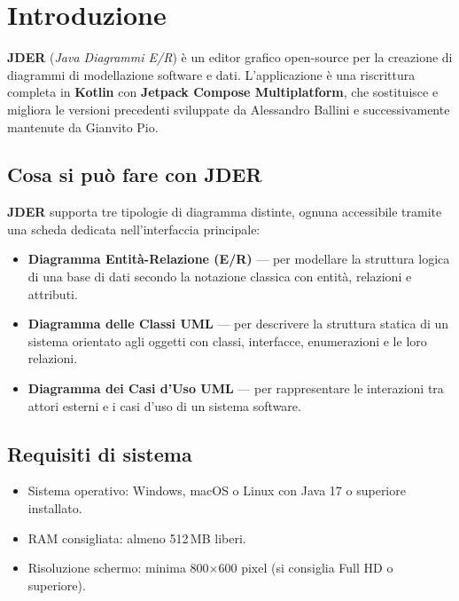 \documentclass[a4paper,11pt]{article}
\newcommand{\jder}{\textbf{JDER}}
\begin{document}
\tableofcontents
\newpage

\section{Introduzione}
\label{sec:intro}

\jder{} (\textit{Java Diagrammi E/R}) è un editor grafico open-source per la creazione di diagrammi
di modellazione software e dati. L'applicazione è una riscrittura completa in \textbf{Kotlin}
con \textbf{Jetpack Compose Multiplatform}, che sostituisce e migliora le versioni precedenti
sviluppate da Alessandro Ballini e successivamente mantenute da Gianvito Pio.

\subsection{Cosa si può fare con JDER}

\jder{} supporta tre tipologie di diagramma distinte, ognuna accessibile tramite una scheda
dedicata nell'interfaccia principale:

\begin{itemize}
  \item \textbf{Diagramma Entità-Relazione (E/R)} --- per modellare la struttura logica di una
        base di dati secondo la notazione classica con entità, relazioni e attributi.
  \item \textbf{Diagramma delle Classi UML} --- per descrivere la struttura statica di un sistema
        orientato agli oggetti con classi, interfacce, enumerazioni e le loro relazioni.
  \item \textbf{Diagramma dei Casi d'Uso UML} --- per rappresentare le interazioni tra attori
        esterni e i casi d'uso di un sistema software.
\end{itemize}

\subsection{Requisiti di sistema}

\begin{itemize}
  \item Sistema operativo: Windows, macOS o Linux con Java 17 o superiore installato.
  \item RAM consigliata: almeno 512\,MB liberi.
  \item Risoluzione schermo: minima 800$\times$600 pixel (si consiglia Full HD o superiore).
\end{itemize}
\end{document}
